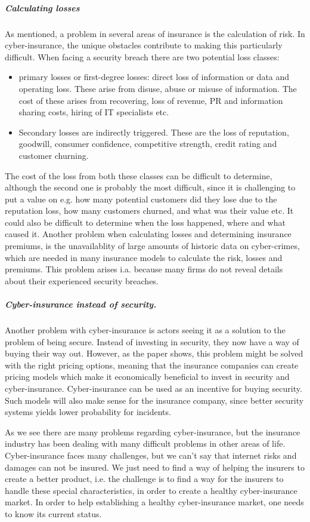 \subparagraph{Calculating losses} As mentioned, a problem in several areas of insurance is the calculation of risk. In cyber-insurance, the unique obstacles contribute to making this particularly difficult. When facing a security breach there are two potential loss classes: \cite{bandyopadhyay2009managers,mehr1980principles} 
\begin{itemize}
\item primary losses or first-degree losses: direct loss of information or data and operating loss. 
These arise from disuse, abuse or misuse of information.
 The cost of these arises from recovering, loss of revenue, 
 PR and information sharing costs, hiring of IT specialists etc.
 \item Secondary losses are indirectly triggered. These are the loss of reputation, goodwill, 
consumer confidence, competitive strength, credit rating and customer churning. 
\end{itemize}
The cost of the loss from both these classes can be difficult to determine, although the second one is probably the most difficult, since it is challenging to put a value on e.g. how many potential customers did they lose due to the reputation loss, how many customers churned, and what was their value etc.
It could also be difficult to determine when the loss happened, where and what caused it.
Another problem when calculating losses and determining insurance premiums, is the unavailablity of large amounts of historic data on cyber-crimes, which are needed in many insurance models to calculate the risk, losses and premiums. This problem arises i.a. because many firms do not reveal details about their experienced security breaches. \cite{herath2007cyber}

\subparagraph{Cyber-insurance instead of security.}
Another problem with cyber-insurance is actors seeing it as a solution to the problem of being secure. Instead of investing in security, they now have a way of buying their way out. 
However, as the paper \cite{bolot2008cyber} shows, this problem might be solved with the right pricing options, meaning that the insurance companies can create pricing models which make it economically beneficial to invest in security and cyber-insurance. Cyber-insurance can be used as an incentive for buying security. Such models will also make sense for the insurance company, since better security systems yields lower probability for incidents.

As we see there are many problems regarding cyber-insurance, but the insurance industry has been dealing with many difficult problems in other areas of life. Cyber-insurance faces many challenges, but we can't say that internet risks and damages can not be insured. We just need to find a way of helping the insurers to create a better product, i.e. the challenge is to find a way for the insurers to handle these special characteristics, in order to create a healthy cyber-insurance market. \cite{lelarge2009economic}
In order to help establishing a healthy cyber-insurance market, one needs to know its current status.
